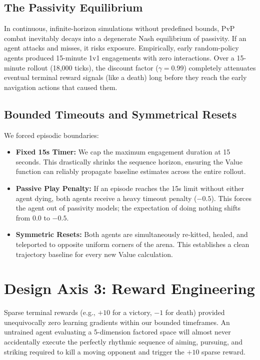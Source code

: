\documentclass[conference]{IEEEtran}
\begin{document}
\subsection{The Passivity Equilibrium}
In continuous, infinite-horizon simulations without predefined bounds, PvP combat inevitably decays into a degenerate Nash equilibrium of passivity. If an agent attacks and misses, it risks exposure. Empirically, early random-policy agents produced 15-minute 1v1 engagements with zero interactions. Over a 15-minute rollout (18,000 ticks), the discount factor ($\gamma = 0.99$) completely attenuates eventual terminal reward signals (like a death) long before they reach the early navigation actions that caused them.

\subsection{Bounded Timeouts and Symmetrical Resets}
We forced episodic boundaries:
\begin{itemize}
    \item \textbf{Fixed 15s Timer:} We cap the maximum engagement duration at 15 seconds. This drastically shrinks the sequence horizon, ensuring the Value function can reliably propagate baseline estimates across the entire rollout.
    \item \textbf{Passive Play Penalty:} If an episode reaches the 15s limit without either agent dying, both agents receive a heavy timeout penalty ($-0.5$). This forces the agent out of passivity models; the expectation of doing nothing shifts from $0.0$ to $-0.5$.
    \item \textbf{Symmetric Resets:} Both agents are simultaneously re-kitted, healed, and teleported to opposite uniform corners of the arena. This establishes a clean trajectory baseline for every new Value calculation.
\end{itemize}


\section{Design Axis 3: Reward Engineering}
Sparse terminal rewards (e.g., $+10$ for a victory, $-1$ for death) provided unequivocally zero learning gradients within our bounded timeframes. An untrained agent evaluating a 5-dimension factored space will almost never accidentally execute the perfectly rhythmic sequence of aiming, pursuing, and striking required to kill a moving opponent and trigger the $+10$ sparse reward.
\end{document}
